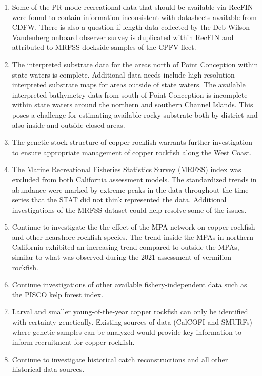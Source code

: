\documentclass[11pt,
  english,
  letterpaper,
]{article}
\begin{document}
\begin{enumerate}
    \item Some of the PR mode recreational data that should be available via RecFIN were found to contain information inconsistent with datasheets available from CDFW. There is also a question if length data collected by the Deb Wilson-Vandenberg onboard observer survey is duplicated within RecFIN and attributed to MRFSS dockside samples of the CPFV fleet.

    \item The interpreted substrate data for the areas north of Point Conception within state waters is complete. Additional data needs include high resolution interpreted substrate maps for areas outside of state waters. The available interpreted bathymetry data from south of Point Conception is incomplete within state waters  around the northern and southern Channel Islands. This poses a challenge for estimating available rocky substrate both by district and also inside and outside closed areas. 

    \item The genetic stock structure of copper rockfish warrants further investigation to ensure appropriate management of copper rockfish along the West Coast. 

    \item The Marine Recreational Fisheries Statistics Survey (MRFSS) index was excluded from both California assessment models. The standardized trends in abundance were marked by extreme peaks in the data throughout the time series that the STAT did not think represented the data. Additional investigations of the MRFSS dataset could help resolve some of the issues.

 \item Continue to investigate the the effect of the MPA network on copper rockfish and other nearshore rockfish species.  The trend inside the MPAs in northern California exhibited an increasing trend compared to outside the MPAs, similar to what was observed during the 2021 assessment of vermilion rockfish.  

 \item Continue investigations of other available fishery-independent data such as the PISCO kelp forest index. 

 \item Larval and smaller young-of-the-year copper rockfish can only be identified with certainty genetically. Existing sources of data (CalCOFI and SMURFs) where genetic samples can be analyzed would provide key information to inform recruitment for copper rockfish.
 
  \item Continue to investigate historical catch reconstructions and all other historical data sources.



\end{enumerate}
\end{document}
